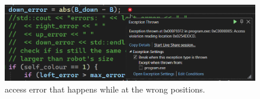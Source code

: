 \begin{figure}[thb]
    \centering
    \includegraphics[width=1\textwidth]{images/access_error.png}
    \caption[access error]{access error that happens while at the wrong positions.}\label{access_error}
\end{figure}

